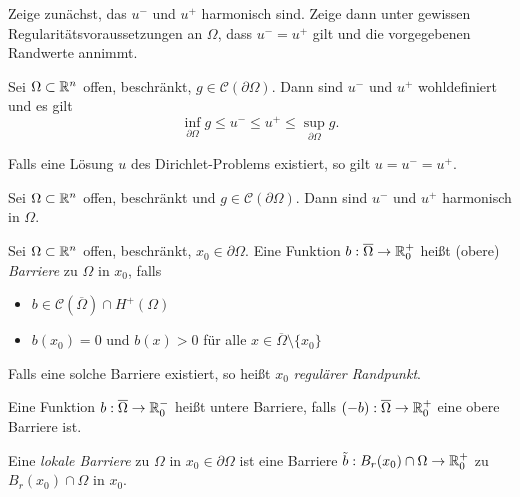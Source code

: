 \documentclass{cheat-sheet}
\begin{document}
\begin{methode}[Perron]
  Zeige zunächst, das $u^-$ und $u^+$ harmonisch sind. Zeige dann unter gewissen Regularitätsvoraussetzungen an $\Omega$, dass $u^- = u^+$ gilt und die vorgegebenen Randwerte annimmt.
\end{methode}

\begin{lem}
  Sei $\Omega \subset \mathbb{R}^n$ offen, beschränkt, $g \in \mathcal{C}(\partial \Omega)$. Dann sind $u^-$ und $u^+$ wohldefiniert und es gilt
  \[ \inf_{\partial \Omega} g \leq u^- \leq u^+ \leq \sup_{\partial \Omega} g. \]
\end{lem}

\begin{bem}
  Falls eine Lösung $u$ des Dirichlet-Problems existiert, so gilt $u = u^- = u^+$.
\end{bem}


\begin{satz}
  Sei $\Omega \subset \mathbb{R}^n$ offen, beschränkt und $g \in \mathcal{C}(\partial \Omega)$. Dann sind $u^-$ und $u^+$ harmonisch in $\Omega$.
\end{satz}

\begin{defn}
  Sei $\Omega \subset \mathbb{R}^n$ offen, beschränkt, $x_0 \in \partial \Omega$. Eine Funktion $b : \overline{\Omega} \to \mathbb{R}_0^+$ heißt (obere) \emph{Barriere} zu $\Omega$ in $x_0$, falls
  \begin{itemize}
    \item $b \in \mathcal{C}(\overline{\Omega}) \cap H^+(\Omega)$
    \item $b(x_0) = 0$ und $b(x) > 0$ für alle $x \in \overline{\Omega} \setminus \{ x_0 \}$
  \end{itemize}
  Falls eine solche Barriere existiert, so heißt $x_0$ \emph{regulärer Randpunkt}.
\end{defn}

\begin{bem}
  Eine Funktion $b : \overline{\Omega} \to \mathbb{R}_0^-$ heißt untere Barriere, falls $(-b) : \overline{\Omega} \to \mathbb{R}_0^+$ eine obere Barriere ist.
\end{bem}

\begin{defn}
  Eine \emph{lokale Barriere} zu $\Omega$ in $x_0 \in \partial \Omega$ ist eine Barriere $\tilde{b} : B_r(x_0) \cap \Omega \to \mathbb{R}^+_0$ zu $B_r(x_0) \cap \Omega$ in $x_0$.
\end{defn}
\end{document}
